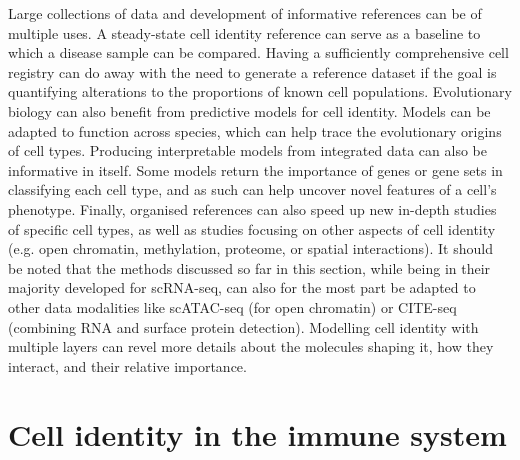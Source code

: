 Large collections of data and development of informative references can be of multiple uses. A steady-state cell identity reference can serve as a baseline to which a disease sample can be compared. Having a sufficiently comprehensive cell registry can do away with the need to generate a reference dataset if the goal is quantifying alterations to the proportions of known cell populations. Evolutionary biology can also benefit from predictive models for cell identity. Models can be adapted to function across species, which can help trace the evolutionary origins of cell types. Producing interpretable models from integrated data can also be informative in itself. Some models return the importance of genes or gene sets in classifying each cell type, and as such can help uncover novel features of a cell's phenotype. Finally, organised references can also speed up new in-depth studies of specific cell types, as well as studies focusing on other aspects of cell identity (e.g. open chromatin, methylation, proteome, or spatial interactions). It should be noted that the methods discussed so far in this section, while being in their majority developed for scRNA-seq, can also for the most part be adapted to other data modalities like scATAC-seq (for open chromatin) or CITE-seq (combining RNA and surface protein detection). Modelling cell identity with multiple layers can revel more details about the molecules shaping it, how they interact, and their relative importance.



\section{Cell identity in the immune system}  %
\label{section1.4}


